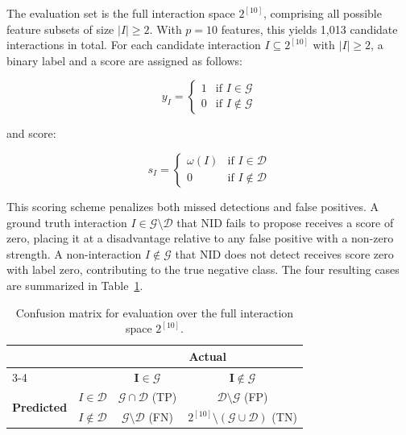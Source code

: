 \documentclass{article}
\begin{document}
The evaluation set is the full interaction space $2^{[10]}$, comprising all 
possible feature subsets of size $|I| \geq 2$. With $p = 10$ features, this 
yields 1,013 candidate interactions in total. For each candidate interaction 
$I \subseteq 2^{[10]}$ with $|I| \geq 2$, a binary label and a score are 
assigned as follows:

\begin{equation}
y_I =
\begin{cases}
1 & \text{if } I \in \mathcal{G} \\
0 & \text{if } I \notin \mathcal{G}
\end{cases}
\end{equation}

\noindent and score:

\begin{equation}
s_I =
\begin{cases}
\omega(I) & \text{if } I \in \mathcal{D} \\
0 & \text{if } I \notin \mathcal{D}
\end{cases}
\end{equation}

\noindent This scoring scheme penalizes both missed detections and false 
positives. A ground truth interaction $I \in \mathcal{G} \setminus \mathcal{D}$ 
that NID fails to propose receives a score of zero, placing it at a 
disadvantage relative to any false positive with a non-zero strength. A 
non-interaction $I \notin \mathcal{G}$ that NID does not detect 
receives score zero with label zero, contributing to the true negative class. 
The four resulting cases are summarized in 
Table~\ref{tab:confusion_matrix_auroc}.

\begin{table}[ht]
\centering
\caption{Confusion matrix for evaluation over the full interaction space 
$2^{[10]}$.}
\label{tab:confusion_matrix_auroc}
\begin{tabular}{llcc}
\toprule
 & & \multicolumn{2}{c}{\textbf{Actual}} \\
\cmidrule(lr){3-4}
 & & $\mathbf{I \in \mathcal{G}}$ & $\mathbf{I \notin \mathcal{G}}$ \\
\midrule
\multirow{2}{*}{\textbf{Predicted}} 
& $I \in \mathcal{D}$    
& $\mathcal{G} \cap \mathcal{D}$ (TP) 
& $\mathcal{D} \setminus \mathcal{G}$ (FP) \\
& $I \notin \mathcal{D}$ 
& $\mathcal{G} \setminus \mathcal{D}$ (FN) 
& $2^{[10]} \setminus (\mathcal{G} \cup \mathcal{D})$ (TN) \\
\bottomrule
\end{tabular}
\end{table}
\end{document}
